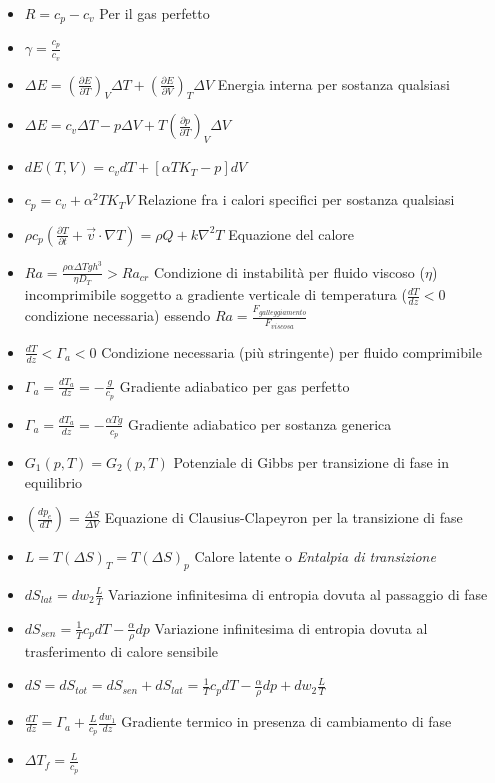 \documentclass[a4paper]{article}
\begin{document}
\begin{itemize}
	\item $R=c_p-c_v$ Per il gas perfetto
	\item $\gamma=\frac{c_p}{c_v}$
	\item $\Delta E = (\frac{\partial E}{\partial T})_V \Delta T +(\frac{\partial E}{\partial V})_T \Delta V$ Energia interna per sostanza qualsiasi
	\item $\Delta E = c_v \Delta T - p\Delta V+ T(\frac{\partial p}{\partial T})_V \Delta V$
	\item $dE(T,V)=c_vdT+[\alpha T K_T-p]dV$
	\item $c_p=c_v+\alpha^2 T K_T V$ Relazione fra i calori specifici per sostanza qualsiasi
	\item $\rho c_p (\frac{\partial T}{\partial t}+\overrightarrow{v} \cdot \nabla T) = \rho Q + k \nabla^2 T$ Equazione del calore
	\item $Ra=\frac{\rho \alpha \Delta T g h^3}{\eta D_T} > Ra_{cr}$ Condizione di instabilità per fluido viscoso ($\eta$) incomprimibile soggetto a gradiente verticale di temperatura ($\frac{dT}{dz}<0$ condizione necessaria) essendo $Ra=\frac{F_{galleggiamento}}{F_{viscosa}}$
	\item $\frac{dT}{dz}<\Gamma_a<0$ Condizione necessaria (più stringente) per fluido comprimibile
	\item $\Gamma_a=\frac{dT_a}{dz}=-\frac{g}{c_p}$ Gradiente adiabatico per gas perfetto
	\item $\Gamma_a = \frac{dT_a}{dz} = -\frac{\alpha T g}{c_p}$ Gradiente adiabatico per sostanza generica
	\item $G_1(p,T)=G_2(p,T)$ Potenziale di Gibbs per transizione di fase in equilibrio
	\item $(\frac{dp_e}{dT})=\frac{\Delta S}{\Delta V}$ Equazione di Clausius-Clapeyron per la transizione di fase
	\item $L=T(\Delta S)_T=T(\Delta S)_p$ Calore latente o \textit{Entalpia di transizione}
	\item $dS_{lat}=dw_2 \frac{L}{T}$ Variazione infinitesima di entropia dovuta al passaggio di fase
	\item $dS_{sen}= \frac{1}{T}c_pdT-\frac{\alpha}{\rho}dp$ Variazione infinitesima di entropia dovuta al trasferimento di calore sensibile
	\item $dS=dS_{tot}=dS_{sen}+dS_{lat} = \frac{1}{T}c_pdT-\frac{\alpha}{\rho}dp + dw_2 \frac{L}{T}$
	\item $\frac{dT}{dz}=\Gamma_a+\frac{L}{c_p} \frac{dw_1}{dz}$ Gradiente termico in presenza di cambiamento di fase
	\item $\Delta T_f = \frac{L}{c_p}$

\end{itemize}
\end{document}
